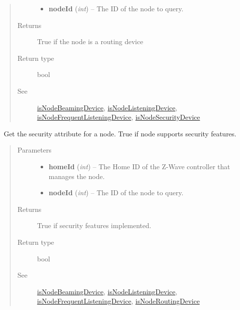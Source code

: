 \documentclass[letterpaper,10pt,english]{sphinxmanual}
\begin{document}
\begin{fulllineitems}
\begin{fulllineitems}
\begin{quote}
\begin{description}
\begin{itemize}
\item {} 
\textbf{nodeId} (\emph{int}) -- The ID of the node to query.

\end{itemize}

\item[{Returns}] \leavevmode
True if the node is a routing device

\item[{Return type}] \leavevmode
bool

\item[{See}] \leavevmode
{\hyperref[libopenzwave:isnodebeamingdevice]{isNodeBeamingDevice}}, {\hyperref[libopenzwave:isnodelisteningdevice]{isNodeListeningDevice}}, {\hyperref[libopenzwave:isnodefrequentlisteningdevice]{isNodeFrequentListeningDevice}}, {\hyperref[libopenzwave:isnodesecuritydevice]{isNodeSecurityDevice}}

\end{description}\end{quote}

\end{fulllineitems}


\begin{fulllineitems}
\label{libopenzwave:libopenzwave.PyManager.isNodeSecurityDevice}~\label{libopenzwave:isnodesecuritydevice}
Get the security attribute for a node. True if node supports security features.
\begin{quote}\begin{description}
\item[{Parameters}] \leavevmode\begin{itemize}
\item {} 
\textbf{homeId} (\emph{int}) -- The Home ID of the Z-Wave controller that manages the node.

\item {} 
\textbf{nodeId} (\emph{int}) -- The ID of the node to query.

\end{itemize}

\item[{Returns}] \leavevmode
True if security features implemented.

\item[{Return type}] \leavevmode
bool

\item[{See}] \leavevmode
{\hyperref[libopenzwave:isnodebeamingdevice]{isNodeBeamingDevice}}, {\hyperref[libopenzwave:isnodelisteningdevice]{isNodeListeningDevice}}, {\hyperref[libopenzwave:isnodefrequentlisteningdevice]{isNodeFrequentListeningDevice}}, {\hyperref[libopenzwave:isnoderoutingdevice]{isNodeRoutingDevice}}


\end{description}
\end{quote}
\end{fulllineitems}
\end{fulllineitems}
\end{document}
